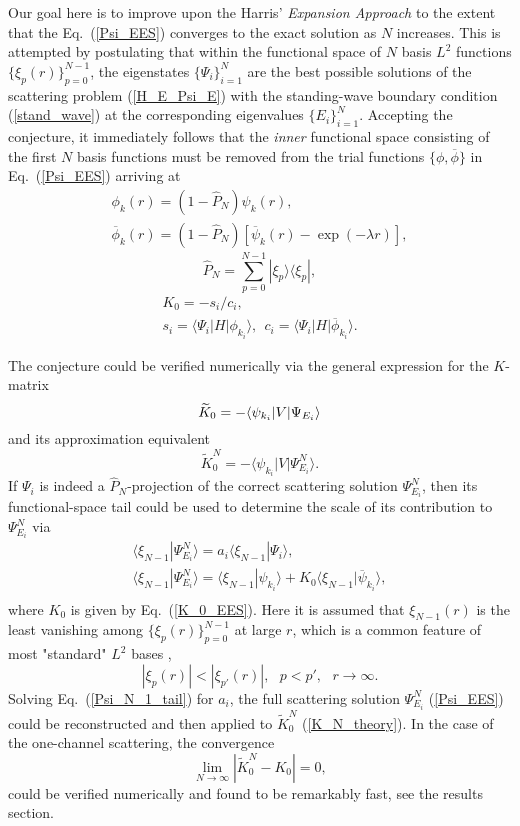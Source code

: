 \documentclass[aip
, pra
, showpacs
, aps
, twocolumn
, groupedaddress
, floatfix
]{revtex4}
\newcommand{\beq}{\begin{equation}}
\newcommand{\eeq}{\end{equation}}
\newcommand{\barr}{\begin{array}}
\newcommand{\earr}{\end{array}}
\begin{document}
Our goal here is to improve upon the Harris' {\em Expansion Approach} \cite{Harris67} to the extent that the Eq.~(\ref{Psi_EES})
converges to the exact solution as $N$ increases.
This is attempted by postulating that
within the functional space of $N$ basis $L^2$ functions  $\{\xi_p(r)\}_{p=0}^{N-1}$,
the eigenstates $\{\Psi_i\}_{i=1}^{N}$ are the best possible solutions of the scattering problem (\ref{H_E_Psi_E})
with the standing-wave boundary condition (\ref{stand_wave}) at the corresponding eigenvalues $\{E_i\}_{i=1}^{N}$.
Accepting the conjecture, it immediately follows that the {\em inner} functional space consisting of the first $N$ basis functions
must be removed from the trial functions $\{\phi,\overline{\phi}\}$ in Eq.~(\ref{Psi_EES}) arriving at
\beq \barr{l}
\phi_k(r) = (1-\hat{P}_N) \psi_k(r),\\
\overline{\phi}_k(r) = (1-\hat{P}_N) [\overline{\psi}_k(r) - \exp{(-\lambda r)}],
\earr \label{def_phi} \eeq
\beq
\hat{P}_N = \sum_{p=0}^{N-1} | \xi_p \rangle \langle \xi_p |,
\label{P_N} \eeq
\beq \barr{l}
K_{0} = - s_i / c_i, \\
s_i = \langle\Psi_i|H|  \phi_{k_i} \rangle, \ \
c_i =  \langle\Psi_i|H|  \overline{\phi}_{k_i} \rangle.
\earr \label{K_0_EES} \eeq


The conjecture could be verified numerically via the general expression for the $K$-matrix \cite{N82}
\beq
\widetilde{K}_0 = -\langle \psi_{k_i} | V | \Psi_{E_i} \rangle\\
\label{K_theory}\eeq
and its approximation equivalent
\beq
\widetilde{K}^N_0 = -\langle \psi_{k_i} | V | \Psi^N_{E_i} \rangle.
\label{K_N_theory}\eeq
If $\Psi_i$ is indeed a $\hat{P}_N$-projection of the correct scattering solution $\Psi^N_{E_i}$,
then its functional-space tail could be used to
determine the scale of its contribution to $\Psi^N_{E_i}$ via
\beq \barr{l}
\langle \xi_{N-1} | \Psi^N_{E_i}\rangle
= a_i \langle \xi_{N-1}| \Psi_i \rangle,\\
\langle \xi_{N-1} | \Psi^N_{E_i}\rangle
 =  \langle \xi_{N-1}| \psi_{k_i} \rangle
+ K_0 \langle \xi_{N-1}| \overline{\psi}_{k_i} \rangle,\\
\earr \label{Psi_N_1_tail} \eeq
where $K_0$ is given by Eq.~(\ref{K_0_EES}).
Here it is assumed that $\xi_{N-1}(r)$ is the least vanishing among $\{\xi_p(r)\}_{p=0}^{N-1}$  at large $r$, which is
a common feature of most "standard" $L^2$ bases \cite{abramowitz},
\beq
|\xi_p(r)| < |\xi_{p'}(r)|, \ \ \ p<p', \ \ \ r \rightarrow \infty.
\eeq
Solving Eq.~(\ref{Psi_N_1_tail}) for $a_i$,
the full scattering solution $\Psi^N_{E_i}$ (\ref{Psi_EES}) could be reconstructed and then applied to $\widetilde{K}^N_0$ (\ref{K_N_theory}).
In the case of the one-channel scattering, the convergence
\beq
\lim_{N \rightarrow \infty} |\widetilde{K}^N_0 - K_0 | = 0,
\label{K_N_0_lim} \eeq
could be verified numerically and found to be
remarkably fast, see the results section.
\end{document}
